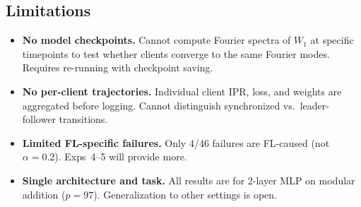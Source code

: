 \documentclass[11pt]{article}
\begin{document}
\subsection{Limitations}

\begin{itemize}
  \item \textbf{No model checkpoints.} Cannot compute Fourier spectra of
        $W_1$ at specific timepoints to test whether clients converge to
        the same Fourier modes. Requires re-running with checkpoint saving.
  \item \textbf{No per-client trajectories.} Individual client IPR, loss,
        and weights are aggregated before logging. Cannot distinguish
        synchronized vs.\ leader-follower transitions.
  \item \textbf{Limited FL-specific failures.} Only 4/46 failures are
        FL-caused (not $\alpha{=}0.2$). Exps~4--5 will provide more.
  \item \textbf{Single architecture and task.} All results are for 2-layer
        MLP on modular addition ($p{=}97$). Generalization to other settings
        is open.
\end{itemize}
\end{document}
